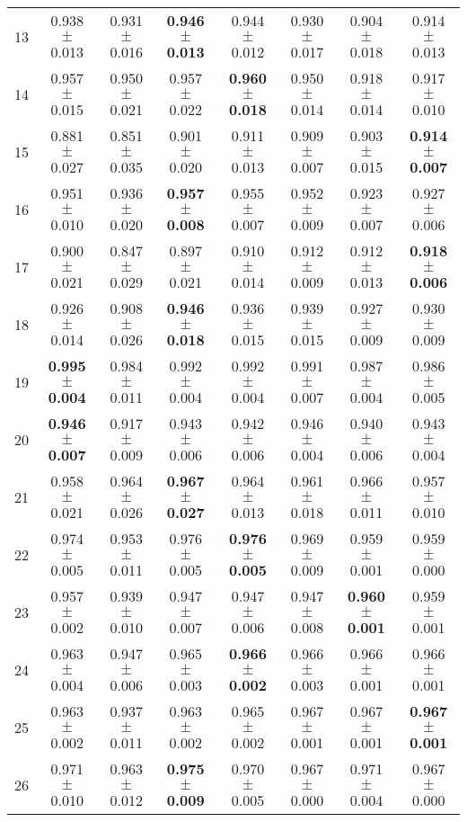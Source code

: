 \begin{table}[!ht]
{\begin{tabular}{r c c c c c c c}
13 & 0.938 $\pm$ 0.013 & 0.931 $\pm$ 0.016 & \textbf{0.946 $\pm$ 0.013} & 0.944 $\pm$ 0.012 & 0.930 $\pm$ 0.017 & 0.904 $\pm$ 0.018 & 0.914 $\pm$ 0.013 \\
14 & 0.957 $\pm$ 0.015 & 0.950 $\pm$ 0.021 & 0.957 $\pm$ 0.022 & \textbf{0.960 $\pm$ 0.018} & 0.950 $\pm$ 0.014 & 0.918 $\pm$ 0.014 & 0.917 $\pm$ 0.010 \\
15 & 0.881 $\pm$ 0.027 & 0.851 $\pm$ 0.035 & 0.901 $\pm$ 0.020 & 0.911 $\pm$ 0.013 & 0.909 $\pm$ 0.007 & 0.903 $\pm$ 0.015 & \textbf{0.914 $\pm$ 0.007} \\
16 & 0.951 $\pm$ 0.010 & 0.936 $\pm$ 0.020 & \textbf{0.957 $\pm$ 0.008} & 0.955 $\pm$ 0.007 & 0.952 $\pm$ 0.009 & 0.923 $\pm$ 0.007 & 0.927 $\pm$ 0.006 \\
17 & 0.900 $\pm$ 0.021 & 0.847 $\pm$ 0.029 & 0.897 $\pm$ 0.021 & 0.910 $\pm$ 0.014 & 0.912 $\pm$ 0.009 & 0.912 $\pm$ 0.013 & \textbf{0.918 $\pm$ 0.006} \\
18 & 0.926 $\pm$ 0.014 & 0.908 $\pm$ 0.026 & \textbf{0.946 $\pm$ 0.018} & 0.936 $\pm$ 0.015 & 0.939 $\pm$ 0.015 & 0.927 $\pm$ 0.009 & 0.930 $\pm$ 0.009 \\
19 & \textbf{0.995 $\pm$ 0.004} & 0.984 $\pm$ 0.011 & 0.992 $\pm$ 0.004 & 0.992 $\pm$ 0.004 & 0.991 $\pm$ 0.007 & 0.987 $\pm$ 0.004 & 0.986 $\pm$ 0.005 \\
20 & \textbf{0.946 $\pm$ 0.007} & 0.917 $\pm$ 0.009 & 0.943 $\pm$ 0.006 & 0.942 $\pm$ 0.006 & 0.946 $\pm$ 0.004 & 0.940 $\pm$ 0.006 & 0.943 $\pm$ 0.004 \\
21 & 0.958 $\pm$ 0.021 & 0.964 $\pm$ 0.026 & \textbf{0.967 $\pm$ 0.027} & 0.964 $\pm$ 0.013 & 0.961 $\pm$ 0.018 & 0.966 $\pm$ 0.011 & 0.957 $\pm$ 0.010 \\
22 & 0.974 $\pm$ 0.005 & 0.953 $\pm$ 0.011 & 0.976 $\pm$ 0.005 & \textbf{0.976 $\pm$ 0.005} & 0.969 $\pm$ 0.009 & 0.959 $\pm$ 0.001 & 0.959 $\pm$ 0.000 \\
23 & 0.957 $\pm$ 0.002 & 0.939 $\pm$ 0.010 & 0.947 $\pm$ 0.007 & 0.947 $\pm$ 0.006 & 0.947 $\pm$ 0.008 & \textbf{0.960 $\pm$ 0.001} & 0.959 $\pm$ 0.001 \\
24 & 0.963 $\pm$ 0.004 & 0.947 $\pm$ 0.006 & 0.965 $\pm$ 0.003 & \textbf{0.966 $\pm$ 0.002} & 0.966 $\pm$ 0.003 & 0.966 $\pm$ 0.001 & 0.966 $\pm$ 0.001 \\
25 & 0.963 $\pm$ 0.002 & 0.937 $\pm$ 0.011 & 0.963 $\pm$ 0.002 & 0.965 $\pm$ 0.002 & 0.967 $\pm$ 0.001 & 0.967 $\pm$ 0.001 & \textbf{0.967 $\pm$ 0.001} \\
26 & 0.971 $\pm$ 0.010 & 0.963 $\pm$ 0.012 & \textbf{0.975 $\pm$ 0.009} & 0.970 $\pm$ 0.005 & 0.967 $\pm$ 0.000 & 0.971 $\pm$ 0.004 & 0.967 $\pm$ 0.000 \\

\end{tabular}}
\end{table}
